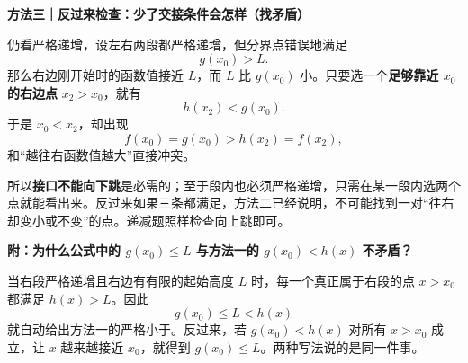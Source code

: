 \clearpage
\begin{proofbox}
\textbf{\textcolor{CProof}{方法三｜反过来检查：少了交接条件会怎样（找矛盾）}}



仍看严格递增，设左右两段都严格递增，但分界点错误地满足
\[
 g(x_0)>L.
\]
那么右边刚开始时的函数值接近 $L$，而 $L$ 比 $g(x_0)$ 小。只要选一个\textbf{足够靠近 $x_0$ 的右边点} $x_2>x_0$，就有
\[
 h(x_2)<g(x_0).
\]
于是 $x_0<x_2$，却出现
\[
 f(x_0)=g(x_0)>h(x_2)=f(x_2),
\]
和“越往右函数值越大”直接冲突。

所以\textbf{接口不能向下跳}是必需的；至于段内也必须严格递增，只需在某一段内选两个点就能看出来。反过来如果三条都满足，方法二已经说明，不可能找到一对“往右却变小或不变”的点。递减题照样检查向上跳即可。

\medskip
\end{proofbox}
\clearpage
\begin{proofbox}
\textbf{\textcolor{CProof}{附：为什么公式中的 $g(x_0)\le L$ 与方法一的 $g(x_0)<h(x)$ 不矛盾？}}



当右段严格递增且右边有有限的起始高度 $L$ 时，每一个真正属于右段的点 $x>x_0$ 都满足 $h(x)>L$。因此
\[
 g(x_0)\le L<h(x)
\]
就自动给出方法一的严格小于。反过来，若 $g(x_0)<h(x)$ 对所有 $x>x_0$ 成立，让 $x$ 越来越接近 $x_0$，就得到 $g(x_0)\le L$。两种写法说的是同一件事。
\end{proofbox}
